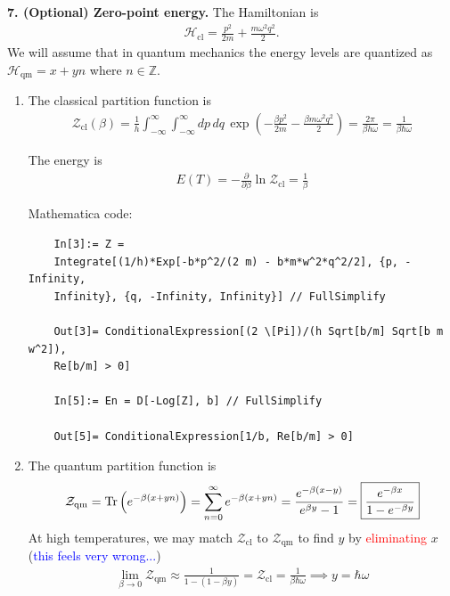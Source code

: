 \documentclass{article}
\theoremstyle{definition}
\newcommand{\p}{\partial}
\newcommand{\ham}{\mathcal{H}}
\newcommand{\be}{\beta}
\newcommand{\f}[2]{\frac{#1}{#2}}
\newcommand{\lp}{\left(}
\newcommand{\rp}{\right)}
\begin{document}
\noindent \textbf{7. (Optional) Zero-point energy.} The Hamiltonian is 
\begin{align*}
\ham_\text{cl} = \f{p^2}{2m} + \f{m\omega^2 q^2}{2}. 
\end{align*}
We will assume that in quantum mechanics the energy levels are quantized as $\ham_\text{qm} = x + yn$ where $n\in \mathbb{Z}$. 

\begin{enumerate}[label=(\alph*)]
	\item The classical partition function is 
	\begin{align*}
	\mathcal{Z}_\text{cl}(\be) = \f{1}{h}\int^\infty_{-\infty}\int^\infty_{-\infty}  dp\,dq\, \exp\lp -\f{\be p^2}{2m} - \f{\be m \omega^2 q^2}{2} \rp =  \f{2\pi}{\be h\omega} = \boxed{\f{1}{\be \hbar \omega}}
	\end{align*}

	
	The energy is 
	\begin{align*}
	E(T) = -\f{\p }{\p \be} \ln \mathcal{Z}_\text{cl} = \boxed{\f{1}{\be}}
	\end{align*}
	
	Mathematica code:
	\begin{lstlisting}
	In[3]:= Z = 
	Integrate[(1/h)*Exp[-b*p^2/(2 m) - b*m*w^2*q^2/2], {p, -Infinity, 
	Infinity}, {q, -Infinity, Infinity}] // FullSimplify
	
	Out[3]= ConditionalExpression[(2 \[Pi])/(h Sqrt[b/m] Sqrt[b m w^2]), 
	Re[b/m] > 0]
	
	In[5]:= En = D[-Log[Z], b] // FullSimplify
	
	Out[5]= ConditionalExpression[1/b, Re[b/m] > 0]
	\end{lstlisting}
	
	\item The quantum partition function is 
	\begin{align*}
	\mathcal{Z}_\text{qm} = \Tr\lp e^{-\be(x+yn)} \rp = \sum_{n=0}^\infty e^{-\be(x+yn)} = {\f{e^{-\be(x-y)}}{e^{\be y} - 1} } = \boxed{\f{e^{-\be x}}{ 1 - e^{-\be y}}}
	\end{align*}
	At high temperatures, we may match $\mathcal{Z}_\text{cl}$ to $\mathcal{Z}_\text{qm}$ to find $y$ by \textcolor{red}{eliminating} $x$ (\textcolor{blue}{this feels very wrong...})
	\begin{align*}
	\lim_{\be \to 0} \mathcal{Z}_\text{qm} \approx \f{1}{ 1 - (1- \be y)} = \mathcal{Z}_\text{cl} = \f{1}{\be \hbar \omega} \implies \boxed{y = \hbar \omega} 
	\end{align*}


\end{enumerate}
\end{document}
